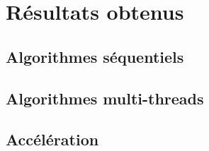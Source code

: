 \section {Résultats obtenus}

\subsection{Algorithmes séquentiels}

\subsection{Algorithmes multi-threads}

\subsection{Accélération}
